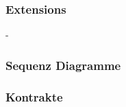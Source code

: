 \documentclass[./detailed_overview_usecases.tex]{subfiles}
\begin{document}
    \subsubsection*{Extensions}
    -

    \subsubsection{Sequenz Diagramme}
    \subsubsection{Kontrakte}
\end{document}
